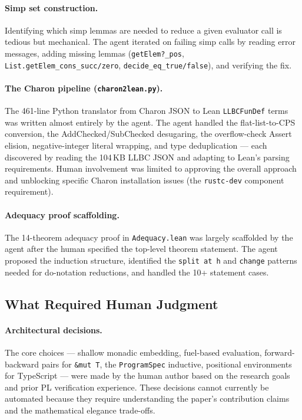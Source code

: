 \paragraph{Simp set construction.}
Identifying which simp lemmas are needed to reduce a given evaluator call is
tedious but mechanical.  The agent iterated on failing simp calls by reading
error messages, adding missing lemmas (\texttt{getElem?\_pos},
\texttt{List.getElem\_cons\_succ/zero}, \texttt{decide\_eq\_true/false}),
and verifying the fix.

\paragraph{The Charon pipeline (\texttt{charon2lean.py}).}
The 461-line Python translator from Charon JSON to Lean \texttt{LLBCFunDef}
terms was written almost entirely by the agent.
The agent handled the flat-list-to-CPS conversion, the AddChecked/SubChecked
desugaring, the overflow-check Assert elision, negative-integer literal
wrapping, and type deduplication — each discovered by reading the 104\,KB
LLBC JSON and adapting to Lean's parsing requirements.
Human involvement was limited to approving the overall approach and
unblocking specific Charon installation issues (the \texttt{rustc-dev}
component requirement).

\paragraph{Adequacy proof scaffolding.}
The 14-theorem adequacy proof in \texttt{Adequacy.lean} was largely
scaffolded by the agent after the human specified the top-level theorem
statement.  The agent proposed the induction structure, identified the
\texttt{split at h} and \texttt{change} patterns needed for do-notation
reductions, and handled the 10+ statement cases.

\subsection{What Required Human Judgment}

\paragraph{Architectural decisions.}
The core choices — shallow monadic embedding, fuel-based evaluation,
forward-backward pairs for \texttt{\&mut T}, the \texttt{ProgramSpec}
inductive, positional environments for TypeScript — were made by the human
author based on the research goals and prior PL verification experience.
These decisions cannot currently be automated because they require understanding
the paper's contribution claims and the mathematical elegance trade-offs.

